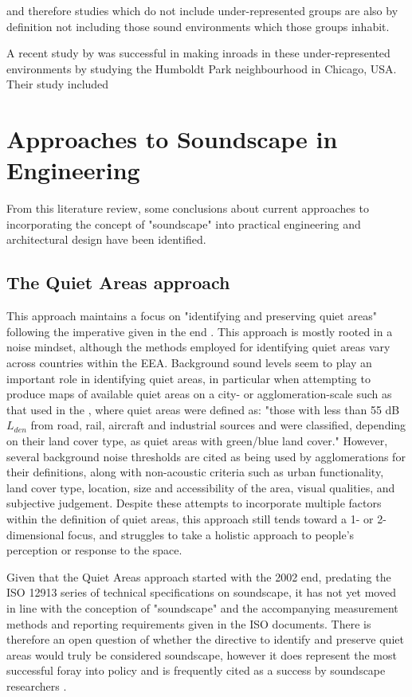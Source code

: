 and therefore studies which do not include under-represented groups are also by definition not including those sound environments which those groups inhabit.

A recent study by  was successful in making inroads in these under-represented environments by studying the Humboldt Park neighbourhood in Chicago, USA. Their study included


\section{Approaches to Soundscape in Engineering}

From this literature review, some conclusions about current approaches to incorporating the concept of "soundscape" into practical engineering and architectural design have been identified.

\subsection{The Quiet Areas approach}

This approach maintains a focus on "identifying and preserving quiet areas" \citep{EEA2020Environment} following the imperative given in the \gls{end} \citep{EU2002Directive}. This approach is mostly rooted in a noise mindset, although the methods employed for identifying quiet areas vary across countries within the EEA. Background sound levels seem to play an important role in identifying quiet areas, in particular when attempting to produce maps of available quiet areas on a city- or agglomeration-scale such as that used in the \citet{EEA2020Environment}, where quiet areas were defined as: "those with less than 55 dB $L_{den}$ from road, rail, aircraft and industrial sources and were classified, depending on their land cover type, as quiet areas with green/blue land cover." However, several background noise thresholds are cited as being used by agglomerations for their definitions, along with non-acoustic criteria such as urban functionality, land cover type, location, size and accessibility of the area, visual qualities, and subjective judgement. %
Despite these attempts to incorporate multiple factors within the definition of quiet areas, this approach still tends toward a 1- or 2-dimensional focus, and struggles to take a holistic approach to people's perception or response to the space.

Given that the Quiet Areas approach started with the 2002 \gls{end}, predating the ISO 12913 series of technical specifications on soundscape, it has not yet moved in line with the conception of "soundscape" and the accompanying measurement methods and reporting requirements given in the ISO documents. There is therefore an open question of whether the directive to identify and preserve quiet areas would truly be considered soundscape, however it does represent the most successful foray into policy and is frequently cited as a success by soundscape researchers .

